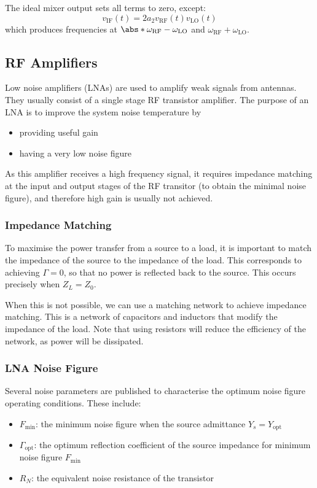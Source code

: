 \documentclass{article}
\begin{document}
The ideal mixer output sets all terms to zero, except:
\begin{equation*}
    v_{\mathrm{IF}}\left( t \right) = 2 a_2 v_{\mathrm{RF}}\left( t \right) v_{\mathrm{LO}}\left( t \right)
\end{equation*}
which produces frequencies at \(\abs*{\omega_{\mathrm{RF}} - \omega_{\mathrm{LO}}}\) and \(\omega_{\mathrm{RF}} + \omega_{\mathrm{LO}}\).
\subsection{RF Amplifiers}
Low noise amplifiers (LNAs) are used to amplify weak signals from
antennas. They usually consist of a single stage RF transistor
amplifier. The purpose of an LNA is to improve the system noise
temperature by
\begin{itemize}
    \item providing useful gain
    \item having a very low noise figure
\end{itemize}
As this amplifier receives a high frequency signal, it requires
impedance matching at the input and output stages of the RF transitor
(to obtain the minimal noise figure), and therefore high gain is usually
not achieved.
\subsubsection{Impedance Matching}
To maximise the power transfer from a source to a load, it is important
to match the impedance of the source to the impedance of the load. This
corresponds to achieving \(\Gamma = 0\), so that no power is reflected
back to the source. This occurs precisely when \(Z_L = Z_0\).

When this is not possible, we can use a matching network to achieve
impedance matching. This is a network of capacitors and inductors that
modify the impedance of the load. Note that using resistors will reduce
the efficiency of the network, as power will be dissipated.
\subsubsection{LNA Noise Figure}
Several noise parameters are published to characterise the optimum
noise figure operating conditions. These include:
\begin{itemize}
    \item \(F_{\min}\): the minimum noise figure when the source admittance \(Y_s = Y_{\mathrm{opt}}\)
    \item \(\Gamma_{\mathrm{opt}}\): the optimum reflection coefficient of the source impedance for minimum noise figure \(F_{\min}\)
    \item \(R_N\): the equivalent noise resistance of the transistor
\end{itemize}
\end{document}
